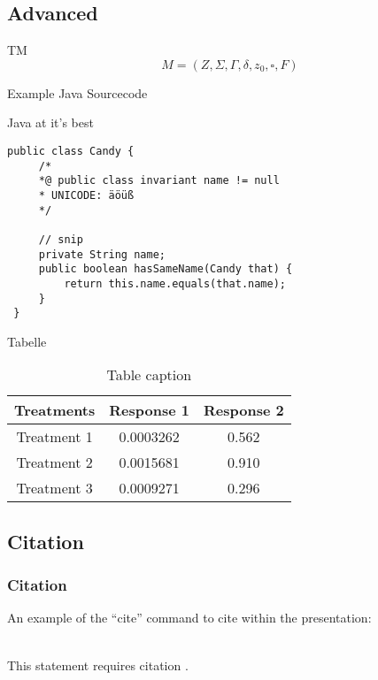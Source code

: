\subsection{Advanced}

\begin{frame}{TM}
	$$M = (Z,\Sigma,\Gamma,\delta,z_0,\square,F)$$
\end{frame}

\begin{frame}[fragile]{Example Java Sourcecode}
	 \begin{block}{Java at it's best}
		\begin{lstlisting}
public class Candy {
	 /*
	 *@ public class invariant name != null
	 * UNICODE: äöüß
	 */

	 // snip
	 private String name;
	 public boolean hasSameName(Candy that) {
		 return this.name.equals(that.name);
	 }
 }
		\end{lstlisting}
	 \end{block}
\end{frame}

\begin{frame}{Tabelle}
	\centering
	\begin{table}
		\begin{tabular}{c c c}
			\toprule
			\textbf{Treatments} & \textbf{Response 1} & \textbf{Response 2} \\
			\midrule
			Treatment 1         & 0.0003262           & 0.562               \\
			Treatment 2         & 0.0015681           & 0.910               \\
			Treatment 3         & 0.0009271           & 0.296               \\
			\bottomrule
		\end{tabular}
		\caption{Table caption}
	\end{table}
\end{frame}

\subsection{Citation}

\begin{frame}[Citation]
    \frametitle{Citation}
    An example of the \enquote{cite} command to cite within the presentation:\\~

    This statement requires citation \cite{p1}.
\end{frame}

